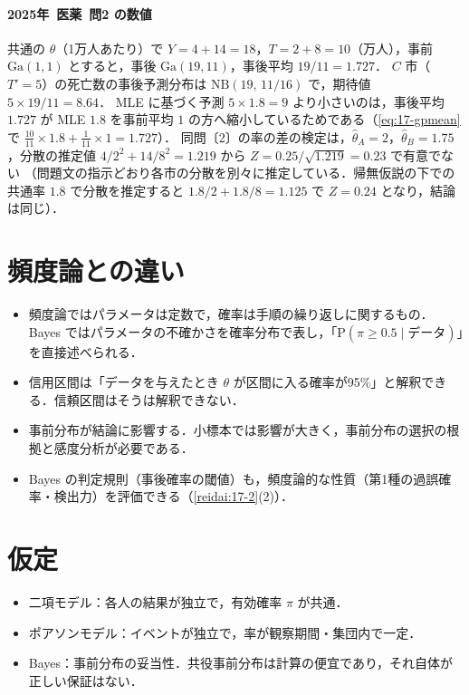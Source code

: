 \documentclass[a4paper,11pt,openany]{ltjsbook}
\newcommand{\kakomon}[2]{\mbox{#1年 医薬 問#2}}
\newcommand{\Prob}{\mathrm{P}}
\newcommand{\Ga}{\mathrm{Ga}}
\newcommand{\NB}{\mathrm{NB}}
\begin{document}
\paragraph{\kakomon{2025}{2} の数値}
共通の $\theta$（1万人あたり）で $Y=4+14=18$，$T=2+8=10$（万人），事前 $\Ga(1,1)$ とすると，事後 $\Ga(19,11)$，事後平均 $19/11=1.727$．
$C$ 市（$T'=5$）の死亡数の事後予測分布は $\NB(19,\,11/16)$ で，期待値 $5\times19/11=8.64$．
MLE に基づく予測 $5\times1.8=9$ より小さいのは，事後平均 $1.727$ が MLE $1.8$ を事前平均 $1$ の方へ縮小しているためである（\cref{eq:17-gpmean}で $\frac{10}{11}\times1.8+\frac{1}{11}\times1=1.727$）．
同問〔2〕の率の差の検定は，$\hat\theta_A=2$，$\hat\theta_B=1.75$，分散の推定値 $4/2^2+14/8^2=1.219$ から $Z=0.25/\sqrt{1.219}=0.23$ で有意でない
（問題文の指示どおり各市の分散を別々に推定している．帰無仮説の下での共通率 $1.8$ で分散を推定すると $1.8/2+1.8/8=1.125$ で $Z=0.24$ となり，結論は同じ）．

\section{頻度論との違い}\label{sec:17-vs}
\begin{itemize}
\item 頻度論ではパラメータは定数で，確率は手順の繰り返しに関するもの．Bayes ではパラメータの不確かさを確率分布で表し，「$\Prob(\pi\ge0.5\mid\text{データ})$」を直接述べられる．
\item 信用区間は「データを与えたとき $\theta$ が区間に入る確率が95\%」と解釈できる．信頼区間はそうは解釈できない．
\item 事前分布が結論に影響する．小標本では影響が大きく，事前分布の選択の根拠と感度分析が必要である．
\item Bayes の判定規則（事後確率の閾値）も，頻度論的な性質（第1種の過誤確率・検出力）を評価できる（\cref{reidai:17-2}(2)）．
\end{itemize}

\section{仮定}\label{sec:17-assump}
\begin{itemize}
\item 二項モデル：各人の結果が独立で，有効確率 $\pi$ が共通．
\item ポアソンモデル：イベントが独立で，率が観察期間・集団内で一定．
\item Bayes：事前分布の妥当性．共役事前分布は計算の便宜であり，それ自体が正しい保証はない．
\end{itemize}
\end{document}
